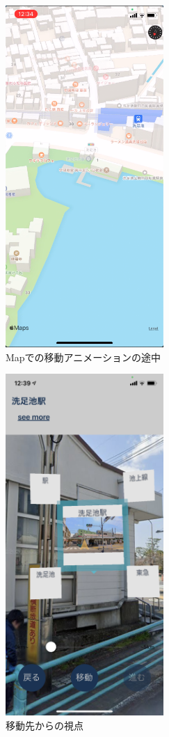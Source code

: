 \begin{figure}[h]
\begin{minipage}{0.5\hsize}
    \includegraphics[width=60mm]{images/hypar_touch_move_map.png}
    \caption{Mapでの移動アニメーションの途中} \label{fig:hypar_touch_move_map}
  \end{minipage}
\end{figure}

\begin{figure}[h]
  \centering
  \includegraphics[width=60mm]{images/hypar_touch_moved.png}
  \caption{移動先からの視点} \label{fig:hypar_touch_moved}
\end{figure}

